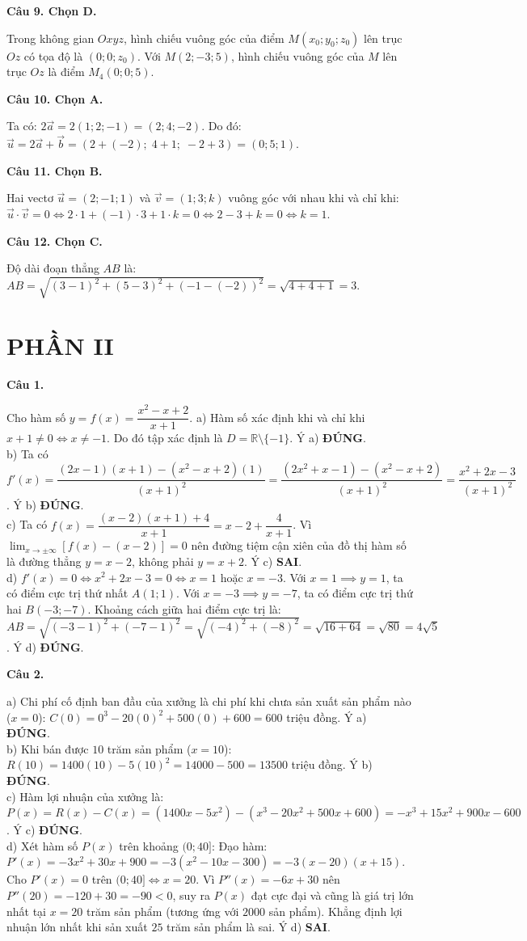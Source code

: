 \documentclass[12pt,a4paper]{article}
\newcommand{\loigiai}[1]{\par\medskip\Needspace{4\baselineskip}\noindent\textbf{#1}\par\nobreak}
\begin{document}
\loigiai{Câu 9. Chọn D.}
Trong không gian $Oxyz$, hình chiếu vuông góc của điểm $M(x_0;y_0;z_0)$ lên trục $Oz$ có tọa độ là $(0;0;z_0)$.
Với $M(2;-3;5)$, hình chiếu vuông góc của $M$ lên trục $Oz$ là điểm $M_4(0;0;5)$.

\loigiai{Câu 10. Chọn A.}
Ta có: $2\vec{a}=2(1;2;-1)=(2;4;-2)$.
Do đó: $\vec{u}=2\vec{a}+\vec{b}=(2+(-2);\; 4+1;\; -2+3)=(0;5;1)$.

\loigiai{Câu 11. Chọn B.}
Hai vectơ $\vec{u}=(2;-1;1)$ và $\vec{v}=(1;3;k)$ vuông góc với nhau khi và chỉ khi:
$\vec{u}\cdot\vec{v}=0 \iff 2\cdot 1 + (-1)\cdot 3 + 1\cdot k = 0 \iff 2-3+k=0 \iff k=1$.

\loigiai{Câu 12. Chọn C.}
Độ dài đoạn thẳng $AB$ là:
$AB=\sqrt{(3-1)^2+(5-3)^2+(-1-(-2))^2}=\sqrt{4+4+1}=3$.

\section*{PHẦN II}

\loigiai{Câu 1.}
Cho hàm số $y=f(x)=\dfrac{x^2-x+2}{x+1}$.
a) Hàm số xác định khi và chỉ khi $x+1\ne 0 \iff x\ne -1$. Do đó tập xác định là $D=\mathbb{R}\setminus\{-1\}$. Ý a) \textbf{ĐÚNG}.\\
b) Ta có $f'(x)=\dfrac{(2x-1)(x+1)-(x^2-x+2)(1)}{(x+1)^2}=\dfrac{(2x^2+x-1)-(x^2-x+2)}{(x+1)^2}=\dfrac{x^2+2x-3}{(x+1)^2}$. Ý b) \textbf{ĐÚNG}.\\
c) Ta có $f(x)=\dfrac{(x-2)(x+1)+4}{x+1}=x-2+\dfrac{4}{x+1}$.
Vì $\lim_{x\to\pm\infty}[f(x)-(x-2)]=0$ nên đường tiệm cận xiên của đồ thị hàm số là đường thẳng $y=x-2$, không phải $y=x+2$. Ý c) \textbf{SAI}.\\
d) $f'(x)=0 \iff x^2+2x-3=0 \iff x=1$ hoặc $x=-3$.
Với $x=1 \implies y=1$, ta có điểm cực trị thứ nhất $A(1;1)$.
Với $x=-3 \implies y=-7$, ta có điểm cực trị thứ hai $B(-3;-7)$.
Khoảng cách giữa hai điểm cực trị là:
$AB=\sqrt{(-3-1)^2+(-7-1)^2}=\sqrt{(-4)^2+(-8)^2}=\sqrt{16+64}=\sqrt{80}=4\sqrt{5}$. Ý d) \textbf{ĐÚNG}.

\loigiai{Câu 2.}
a) Chi phí cố định ban đầu của xưởng là chi phí khi chưa sản xuất sản phẩm nào ($x=0$):
$C(0)=0^3-20(0)^2+500(0)+600=600$ triệu đồng. Ý a) \textbf{ĐÚNG}.\\
b) Khi bán được $10$ trăm sản phẩm ($x=10$):
$R(10)=1400(10)-5(10)^2=14000-500=13500$ triệu đồng. Ý b) \textbf{ĐÚNG}.\\
c) Hàm lợi nhuận của xưởng là:
$P(x)=R(x)-C(x)=(1400x-5x^2)-(x^3-20x^2+500x+600)=-x^3+15x^2+900x-600$. Ý c) \textbf{ĐÚNG}.\\
d) Xét hàm số $P(x)$ trên khoảng $(0;40]$:
Đạo hàm: $P'(x)=-3x^2+30x+900=-3(x^2-10x-300)=-3(x-20)(x+15)$.
Cho $P'(x)=0$ trên $(0;40] \iff x=20$.
Vì $P''(x)=-6x+30$ nên $P''(20)=-120+30=-90<0$, suy ra $P(x)$ đạt cực đại và cũng là giá trị lớn nhất tại $x=20$ trăm sản phẩm (tương ứng với $2000$ sản phẩm).
Khẳng định lợi nhuận lớn nhất khi sản xuất $25$ trăm sản phẩm là sai. Ý d) \textbf{SAI}.
\end{document}

